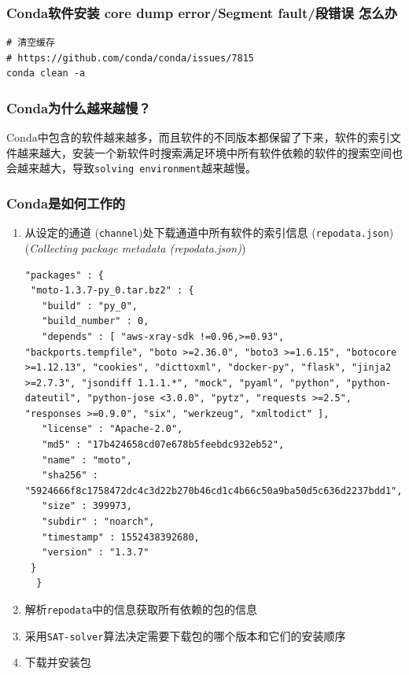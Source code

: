 \documentclass[]{article}
\numberwithin{figure}{section}
\numberwithin{table}{section}
\begin{document}
\hypertarget{cond_segment_fault}{%
\subsubsection{Conda软件安装 core dump error/Segment fault/段错误 怎么办}\label{cond_segment_fault}}

\begin{verbatim}
# 清空缓存
# https://github.com/conda/conda/issues/7815
conda clean -a
\end{verbatim}

\hypertarget{conda_slow}{%
\subsubsection{Conda为什么越来越慢？}\label{conda_slow}}

Conda中包含的软件越来越多，而且软件的不同版本都保留了下来，软件的索引文件越来越大，安装一个新软件时搜索满足环境中所有软件依赖的软件的搜索空间也会越来越大，导致\texttt{solving\ environment}越来越慢。

\hypertarget{conda_how_work}{%
\subsubsection{Conda是如何工作的}\label{conda_how_work}}

\begin{enumerate}
\def\labelenumi{\arabic{enumi}.}
\item
  从设定的通道 (\texttt{channel})处下载通道中所有软件的索引信息 (\texttt{repodata.json}) (\emph{Collecting package metadata (repodata.json)})

\begin{verbatim}
"packages" : {
 "moto-1.3.7-py_0.tar.bz2" : {
   "build" : "py_0",
   "build_number" : 0,
   "depends" : [ "aws-xray-sdk !=0.96,>=0.93", "backports.tempfile", "boto >=2.36.0", "boto3 >=1.6.15", "botocore >=1.12.13", "cookies", "dicttoxml", "docker-py", "flask", "jinja2 >=2.7.3", "jsondiff 1.1.1.*", "mock", "pyaml", "python", "python-dateutil", "python-jose <3.0.0", "pytz", "requests >=2.5", "responses >=0.9.0", "six", "werkzeug", "xmltodict" ],
   "license" : "Apache-2.0",
   "md5" : "17b424658cd07e678b5feebdc932eb52",
   "name" : "moto",
   "sha256" : "5924666f8c1758472dc4c3d22b270b46cd1c4b66c50a9ba50d5c636d2237bdd1",
   "size" : 399973,
   "subdir" : "noarch",
   "timestamp" : 1552438392680,
   "version" : "1.3.7"
 }
  }
\end{verbatim}
\item
  解析\texttt{repodata}中的信息获取所有依赖的包的信息
\item
  采用\texttt{SAT-solver}算法决定需要下载包的哪个版本和它们的安装顺序
\item
  下载并安装包
\end{enumerate}
\end{document}
